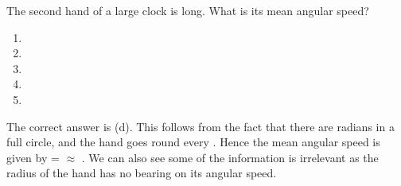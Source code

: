 
\begin{problem}[A1987PIQ7l] 
{The second hand of a large clock is  long. What is its mean angular speed?
\begin{enumerate}
	\item {}
	\item {}
	\item {}
	\item {} \answer
	\item {}
\end{enumerate}}
{}
{The correct answer is (d). This follows from the fact that there are \vari{2\pi} radians in a full circle, and the hand goes round every . Hence the mean angular speed is given by  =  $\approx$ . We can also see some of the information is irrelevant as the radius of the hand has no bearing on its angular speed.}
\end{problem}